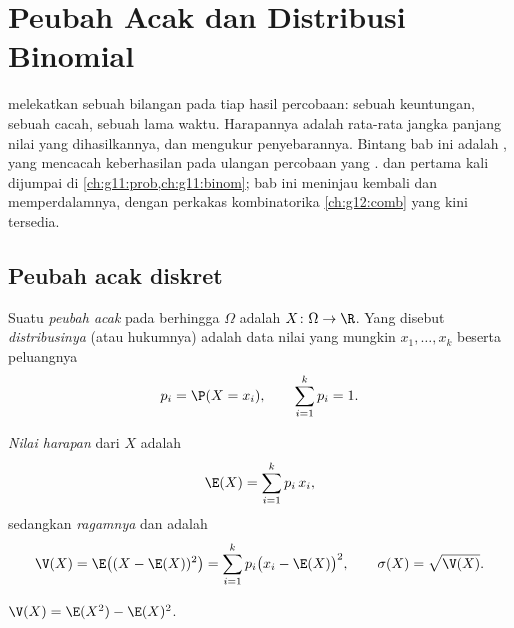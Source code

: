 \chapter{Peubah Acak dan Distribusi Binomial}\label{ch:g12:randvar}

 melekatkan sebuah bilangan pada tiap hasil percobaan: sebuah
keuntungan, sebuah cacah, sebuah lama waktu. Harapannya adalah rata-rata jangka
panjang nilai yang dihasilkannya, dan  mengukur penyebarannya. Bintang bab
ini adalah , yang mencacah keberhasilan pada ulangan percobaan
yang .  dan  pertama kali
dijumpai di \cref{ch:g11:prob,ch:g11:binom}; bab ini meninjau kembali dan
memperdalamnya, dengan perkakas kombinatorika \cref{ch:g12:comb} yang kini
tersedia.

\section{Peubah acak diskret}

\begin{definition}\label{def:g12:randvar:rv}
Suatu \emph{peubah acak} pada  berhingga
$\Omega$ adalah  $X \colon \Omega \to \R$. Yang disebut
\emph{distribusinya} (atau hukumnya) adalah data nilai
yang mungkin $x_1, \dots, x_k$ beserta peluangnya
\[
p_i = \P(X = x_i), \qquad \sum_{i=1}^{k} p_i = 1 .
\]
\end{definition}

\begin{definition}\label{def:g12:randvar:exp}
\emph{Nilai harapan} dari $X$ adalah
\[
\E(X) = \sum_{i=1}^{k} p_i\, x_i ,
\]
sedangkan \emph{ragamnya} dan \emph{} adalah
\[
\V(X) = \E\bigl((X - \E(X))^2\bigr) = \sum_{i=1}^k p_i\bigl(x_i - \E(X)\bigr)^2,
\qquad
\sigma(X) = \sqrt{\V(X)} .
\]
\end{definition}

\begin{proposition}\label{prop:g12:randvar:konig}
$\V(X) = \E(X^2) - \E(X)^2$.
\end{proposition}

